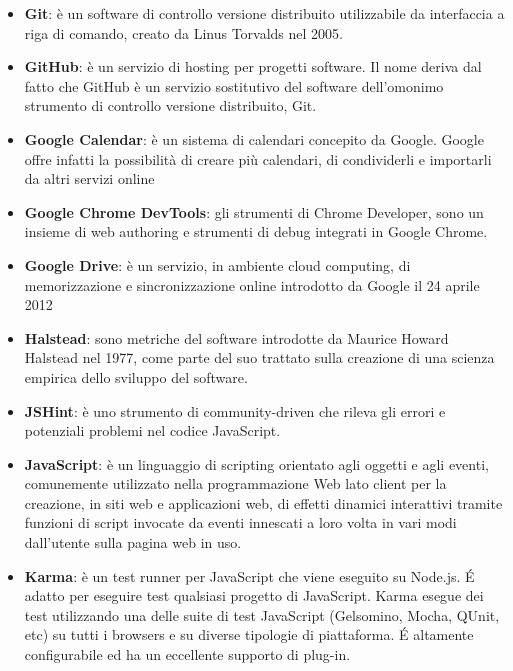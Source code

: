 \begin{itemize}
\item[] \textbf{Git}: è un software di controllo versione distribuito utilizzabile da interfaccia a riga di comando, creato da Linus Torvalds nel 2005.
\item[] \textbf{GitHub}: è un servizio di hosting per progetti software. Il nome deriva dal fatto che GitHub è un servizio sostitutivo del software dell'omonimo strumento di controllo versione distribuito, Git.
\item[] \textbf{Google Calendar}: è un sistema di calendari concepito da Google. Google offre infatti la possibilità di creare più calendari, di condividerli e importarli da altri servizi online
\item[] \textbf{Google Chrome DevTools}: gli strumenti di Chrome Developer, sono un insieme di web authoring e strumenti di debug integrati in Google Chrome.
\item[] \textbf{Google Drive}: è un servizio, in ambiente cloud computing, di memorizzazione e sincronizzazione online introdotto da Google il 24 aprile 2012
\end{itemize}
\newpage

\begin{itemize}
\item[] \textbf{Halstead}: sono metriche del software introdotte da Maurice Howard Halstead nel 1977, come parte del suo trattato sulla creazione di una scienza empirica dello sviluppo del software.
\end{itemize}
\newpage

\begin{itemize}
\item[] \textbf{JSHint}: è uno strumento di community-driven che rileva gli errori e potenziali problemi nel codice JavaScript.
\item[] \textbf{JavaScript}: è un linguaggio di scripting orientato agli oggetti e agli eventi, comunemente utilizzato nella programmazione Web lato client per la creazione, in siti web e applicazioni web, di effetti dinamici interattivi tramite funzioni di script invocate da eventi innescati a loro volta in vari modi dall'utente sulla pagina web in uso.
\end{itemize}
\newpage

\begin{itemize}
\item[] \textbf{Karma}: è un test runner per JavaScript che viene eseguito su Node.js. \'E adatto per eseguire test qualsiasi progetto di JavaScript. Karma esegue dei test utilizzando una delle suite di test JavaScript (Gelsomino, Mocha, QUnit, etc) su tutti i browsers e su diverse tipologie di piattaforma. \'E altamente configurabile ed ha un eccellente supporto di plug-in.
\end{itemize}
\newpage

